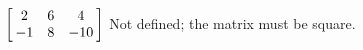{$\left[\hskip -3pt \begin{array}{ccc} 2&6&4\\  -1&8&-10
\end{array}\hskip -3pt \right]$} 
{Not defined; the matrix must be square.}



  

